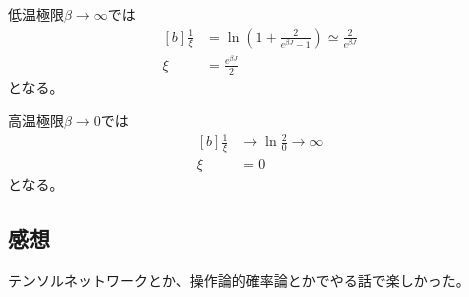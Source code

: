 \documentclass[../../sp_2018.tex]{subfiles}
\begin{document}
低温極限\(\beta\to \infty\)では
\begin{equation}\begin{aligned}[b]
    \frac{1}{\xi} &= \ln(1+\frac{2}{e^{\beta J}-1}) \simeq \frac{2}{e^{\beta J}}\\
    \xi &= \frac{e^{\beta J}}{2}
\end{aligned}\end{equation}
となる。

高温極限\(\beta\to 0\)では
\begin{equation}\begin{aligned}[b]
    \frac{1}{\xi} &\to \ln \frac{2}{0} \to \infty\\
    \xi &= 0
\end{aligned}\end{equation}
となる。


\subsection*{感想}
テンソルネットワークとか、操作論的確率論とかでやる話で楽しかった。
\end{document}
